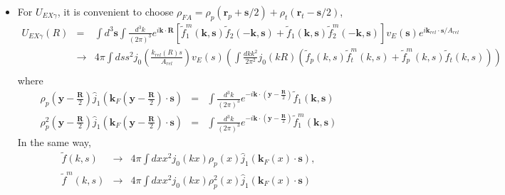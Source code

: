 \documentclass[11pt]{book}
\def\bm{\boldsymbol}
\def\vk{{\bm k}}
\def\vr{{\bm r}}
\def\vR{{\bm R}}
\newcommand{\bea}{\begin{eqnarray}}
\newcommand{\eea}{\end{eqnarray}}
\newcommand{\no}{\nonumber \\}
\begin{document}
\begin{itemize}
	  
	\item For $U_{EX\gamma}$, it is convenient to choose  $\rho_{FA} = \rho_{p}(\vr_p+{\bm s}/2)+\rho_t(\vr_t-{\bm s}/2)$,
	\bea 
	  U_{EX\gamma}(R) &=& 
	     \int d^3{\bm s}\int\frac{d^3 k}{(2\pi)^3} e^{i\vk\cdot\vR} 
	      \left[\tilde{f}^m_1(\vk,{\bm s})\tilde{f}_2(-\vk,{\bm s})+
	      \tilde{f}_1(\vk,{\bm s})\tilde{f}^m_2(-\vk,{\bm s})\right] 
	          v_E({\bm s}) e^{ i\vk_{rel}\cdot{\bm s} /A_{rel}} \no 
	       &\to & 4\pi \int ds s^2 j_0(\frac{k_{rel}(R) s}{A_{rel}}) v_E (s) 
	       \left( \int \frac{dk k^2}{2\pi^2} j_0(k R)
	       (\tilde{f}_p(k,s)\tilde{f}^m_t(k,s)+\tilde{f}^m_p(k,s)\tilde{f}_t(k,s) )  \right)  \no 
	\eea 
	where 
	\bea 
	\rho_p({\bm y}-\frac{\vR}{2})\hat{j}_1( {\bm k_F}({\bm y}-\frac{\vR}{2})\cdot {\bm s})
	&=& \int \frac{d^3 k}{(2\pi)^3} e^{-i\vk\cdot({\bm y}-\frac{\vR}{2})}
	\tilde{f}_1({\bm k},{\bm s}) \no 
	\rho^2_p({\bm y}-\frac{\vR}{2})\hat{j}_1( {\bm k_F}({\bm y}-\frac{\vR}{2})\cdot {\bm s})
	&=& \int \frac{d^3 k}{(2\pi)^3} e^{-i\vk\cdot({\bm y}-\frac{\vR}{2})}
	\tilde{f}^m_1({\bm k},{\bm s})
	\eea 
	In the same way,
	\bea 
	\tilde{f}(k,s) &\to& 4\pi \int dx x^2 j_0(k x) \rho_p(x)\hat{j}_1( {\bm k_F}(x)\cdot {\bm s})  ,\no 
	\tilde{f}^m(k,s) &\to& 4\pi \int dx x^2 j_0(k x) \rho^2_p(x)\hat{j}_1( {\bm k_F}(x)\cdot {\bm s})
	\eea 
\end{itemize}
\end{document}
